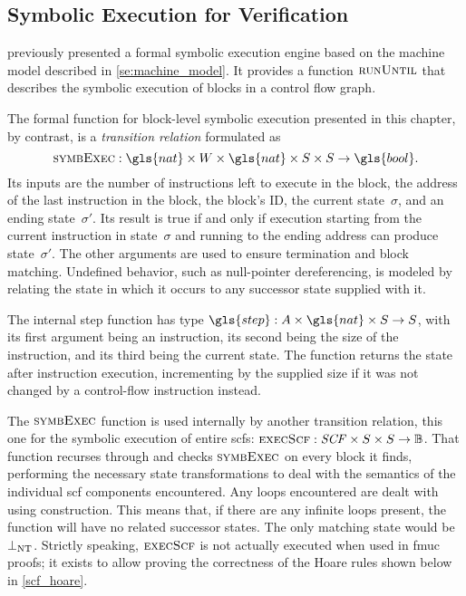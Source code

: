 \subsection{Symbolic Execution for Verification}\label{sse:syntax_ver_symb}
 previously presented a formal symbolic execution engine
based on the machine model described in \cref{se:machine_model}.
It provides a function $\operatorname{\textsc{runUntil}}$ that describes the symbolic execution of
blocks in a control flow graph.

The formal function for block-level symbolic execution presented in this chapter,%
by contrast, is a \emph{transition relation}%
 formulated as
\begin{equation*}
  \execblock:\gls{nat}\times W\times\gls{nat}\times S\times S\rightarrow\gls{bool}.
\end{equation*}
Its inputs are the number of instructions left to execute in the block,
the address of the last instruction in the block, the block's ID,
the current state~$\sigma$, and an ending state~$\sigma'$.
Its result is true if and only if execution
starting from the current instruction in state~$\sigma$
and running to the ending address can produce state~$\sigma'$.
The other arguments are used to ensure termination and block matching.
Undefined behavior, such as null-pointer dereferencing,
is modeled by relating the state in which it occurs to any successor state
supplied with it.

The internal step function has type $\gls{step}:A\times\gls{nat}\times S\rightarrow S$,
with its first argument being an instruction, its second being the size of the instruction,
and its third being the current state.
The function returns the state after instruction execution,
incrementing  by the supplied size
if it was not changed by a control-flow instruction instead.

The $\operatorname{\textsc{symbExec}}$ function is used internally by another transition relation,
this one for the symbolic execution of entire \acp{scf}:
$\operatorname{\textsc{execScf}}:\mathit{SCF}\times S\times S\rightarrow\mathbb{B}$.
That function recurses through 
and checks $\operatorname{\textsc{symbExec}}$ on every block it finds,
performing the necessary state transformations to deal with the semantics of
the individual \ac{scf} components encountered.
Any loops encountered are dealt with using  construction.
This means that, if there are any infinite loops present,
the function will have no related successor states.
The only matching state would be $\bot_\mathrm{NT}$.
Strictly speaking, $\operatorname{\textsc{execScf}}$ is not actually executed when used in \ac{fmuc} proofs;
it exists to allow proving the correctness
of the Hoare rules shown below in \cref{scf_hoare}.

